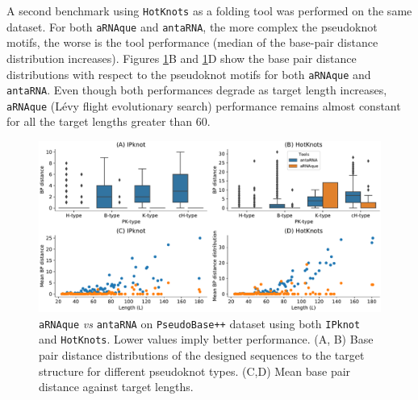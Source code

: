 A second benchmark using \texttt{HotKnots} as a folding tool was performed on the same dataset. For both \texttt{aRNAque} and \texttt{antaRNA}, the more complex the pseudoknot motifs, the worse is the tool performance (median of the base-pair distance distribution increases). Figures \ref{Fig:antaRNA_vs_aRNAque}B and \ref{Fig:antaRNA_vs_aRNAque}D show the base pair distance distributions with respect to the pseudoknot motifs for both \texttt{aRNAque} and \texttt{antaRNA}. Even though both performances degrade as target length increases, \texttt{aRNAque} (Lévy flight evolutionary search) performance remains almost constant for all the target lengths greater than $60$.
\begin{figure}[t!]
	\includegraphics[width=1.0\linewidth]{../res/images/arnaque/fig5.pdf}
	\caption{\texttt{aRNAque} \emph{vs} \texttt{antaRNA} on \texttt{PseudoBase++} dataset using both  \texttt{IPknot} and \texttt{HotKnots}. Lower values imply better performance. (A, B) Base pair distance distributions of the designed sequences to the target structure for different pseudoknot types. (C,D) Mean base pair distance against target lengths. }\label{Fig:antaRNA_vs_aRNAque}
\end{figure}

